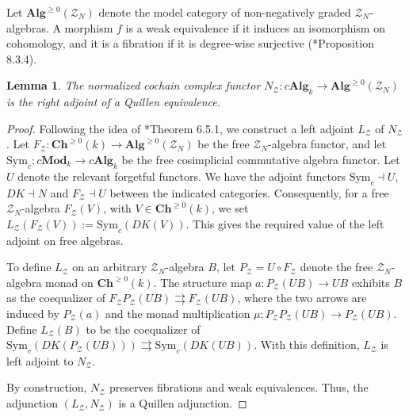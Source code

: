 \documentclass[11pt]{amsart}
\newtheorem{lemma}[theorem]{Lemma}
\theoremstyle{definition}
\numberwithin{equation}{section}
\numberwithin{equation}{section}
\begin{document}
Let $\mathbf{Alg}^{\geq 0}(\mathcal{Z}_N)$ denote the model category of non-negatively graded $\mathcal{Z}_N$-algebras. A morphism $f$ is a weak equivalence if it induces an isomorphism on cohomology, and it is a fibration if it is degree-wise surjective (\cite{Richter-cosimplicial-algebras-and-normalization-functor}*{Proposition 8.3.4}).

\begin{lemma}\label{Lem: Quillen equivalence of normalized cochain complex functor into Eilenberg-Zilber algebras}
The normalized cochain complex functor $N_{\mathcal{Z}}:c\mathbf{Alg}_k\rightarrow \mathbf{Alg}^{\geq 0}(\mathcal{Z}_N)$ is the right adjoint of a Quillen equivalence.
\end{lemma}

\begin{proof}
Following the idea of \cite{Richter-cosimplicial-algebras-and-normalization-functor}*{Theorem 6.5.1}, we construct a left adjoint $L_{\mathcal{Z}}$ of $N_{\mathcal{Z}}$. Let $F_{\mathcal{Z}}:\mathbf{Ch}^{\geq 0}(k)\rightarrow \mathbf{Alg}^{\geq 0}(\mathcal{Z}_N)$ be the free $\mathcal{Z}_N$-algebra functor, and let $\mathrm{Sym}_c:c\mathbf{Mod}_k\rightarrow c\mathbf{Alg}_k$ be the free cosimplicial commutative algebra functor. Let $U$ denote the relevant forgetful functors. We have the adjoint functors $\mathrm{Sym}_c\dashv U$, $DK\dashv N$ and $F_{\mathcal{Z}}\dashv U$ between the indicated categories. Consequently, for a free $\mathcal{Z}_N$-algebra $F_{\mathcal{Z}}(V)$, with $V\in \mathbf{Ch}^{\geq 0}(k)$, we set $L_{\mathcal{Z}}(F_{\mathcal{Z}}(V)):=\mathrm{Sym}_c(DK(V))$. This gives the required value of the left adjoint on free algebras. 

To define $L_{\mathcal{Z}}$ on an arbitrary $\mathcal{Z}_N$-algebra $B$, let $P_{\mathcal{Z}}=U\circ F_{\mathcal{Z}}$ denote the free $\mathcal{Z}_N$-algebra monad on $\mathbf{Ch}^{\geq 0}(k)$. The  structure map $a:P_{\mathcal{Z}}(UB)\rightarrow UB$ exhibits $B$ as the coequalizer of $F_{\mathcal{Z}}P_{\mathcal{Z}}(UB)\rightrightarrows F_{\mathcal{Z}}(UB)$, where the two arrows are induced by $P_{\mathcal{Z}}(a)$ and the monad multiplication $\mu:P_{\mathcal{Z}}P_{\mathcal{Z}}(UB)\rightarrow P_{\mathcal{Z}}(UB)$. Define $L_{\mathcal{Z}}(B)$ to be the coequalizer of $\mathrm{Sym}_c(DK(P_{\mathcal{Z}}(UB)))\rightrightarrows \mathrm{Sym}_c(DK(UB))$. With this definition, $L_{\mathcal{Z}}$ is left adjoint to $N_{\mathcal{Z}}$.

By construction, $N_{\mathcal{Z}}$ preserves fibrations and weak equivalences. Thus, the adjunction $(L_{\mathcal{Z}},N_{\mathcal{Z}})$ is a Quillen adjunction.


\end{proof}
\end{document}
